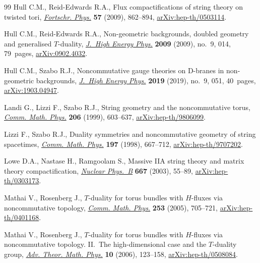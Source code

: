 \begin{thebibliography}{99}
Hull C.M., Reid-Edwards R.A., Flux compactifications of string theory on
 twisted tori, \href{https://doi.org/10.1002/prop.200900076}{\textit{Fortschr. Phys.}} \textbf{57} (2009), 862--894,
 \href{https://arxiv.org/abs/hep-th/0503114}{arXiv:hep-th/0503114}.

Hull C.M., Reid-Edwards R.A., Non-geometric backgrounds, doubled geometry and
 generalised {$T$}-duality, \href{https://doi.org/10.1088/1126-6708/2009/09/014}{\textit{J.~High Energy Phys.}} \textbf{2009}
 (2009), no.~9, 014, 79~pages, \href{https://arxiv.org/abs/0902.4032}{arXiv:0902.4032}.

Hull C.M., Szabo R.J., Noncommutative gauge theories on {D}-branes in
 non-geometric backgrounds, \href{https://doi.org/10.1007/jhep09(2019)051}{\textit{J.~High Energy Phys.}} \textbf{2019}
 (2019), no.~9, 051, 40~pages, \href{https://arxiv.org/abs/1903.04947}{arXiv:1903.04947}.

Landi G., Lizzi F., Szabo R.J., String geometry and the noncommutative torus,
 \href{https://doi.org/10.1007/s002200050839}{\textit{Comm. Math. Phys.}} \textbf{206} (1999), 603--637,
 \href{https://arxiv.org/abs/hep-th/9806099}{arXiv:hep-th/9806099}.

Lizzi F., Szabo R.J., Duality symmetries and noncommutative geometry of string
 spacetimes, \href{https://doi.org/10.1007/s002200050468}{\textit{Comm. Math. Phys.}} \textbf{197} (1998), 667--712,
 \href{https://arxiv.org/abs/hep-th/9707202}{arXiv:hep-th/9707202}.

Lowe D.A., Nastase H., Ramgoolam S., Massive {IIA} string theory and matrix
 theory compactification, \href{https://doi.org/10.1016/S0550-3213(03)00547-9}{\textit{Nuclear Phys.~B}} \textbf{667} (2003),
 55--89, \href{https://arxiv.org/abs/hep-th/0303173}{arXiv:hep-th/0303173}.

Mathai V., Rosenberg J., {$T$}-duality for torus bundles with {$H$}-fluxes via
 noncommutative topology, \href{https://doi.org/10.1007/s00220-004-1159-7}{\textit{Comm. Math. Phys.}} \textbf{253} (2005),
 705--721, \href{https://arxiv.org/abs/hep-th/0401168}{arXiv:hep-th/0401168}.

Mathai V., Rosenberg J., {$T$}-duality for torus bundles with {$H$}-fluxes via
 noncommutative topology. {II}.~{T}he high-dimensional case and the
 {$T$}-duality group, \href{https://doi.org/10.4310/ATMP.2006.v10.n1.a5}{\textit{Adv. Theor. Math. Phys.}} \textbf{10} (2006),
 123--158, \href{https://arxiv.org/abs/hep-th/0508084}{arXiv:hep-th/0508084}.


\end{thebibliography}
